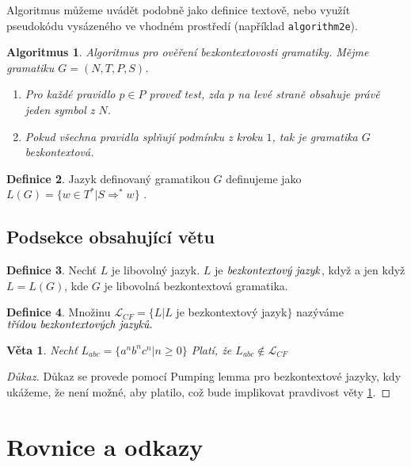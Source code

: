 \documentclass[11pt,a4paper, twocolumn]{article}
\theoremstyle{definition}
\newtheorem{defn}{Definice}[section]
\theoremstyle{plain}
\newtheorem{algr}[defn]{Algoritmus}
\newtheorem{veta}{Věta}
\begin{document}
Algoritmus můžeme uvádět podobně jako definice textově, nebo využít pseudokódu vysázeného ve vhodném prostředí (například \verb|algorithm2e|).


\begin{algr}Algoritmus pro ověření bezkontextovosti gramatiky. Mějme gramatiku $G = (N, T, P, S)$.
\begin{enumerate}
 \item Pro každé pravidlo $p\in P$ proveď test, zda $p$ na levé straně obsahuje právě jeden symbol z $N$.
 \item Pokud všechna pravidla splňují podmínku z kroku $1$, tak je gramatika $G$ bezkontextová.
\end{enumerate} 
\end{algr}

\begin{defn}Jazyk definovaný gramatikou $G$ definujeme jako $L(G) = \{ w\in T^*|S \Rightarrow ^* w\}$ .\end{defn}

\subsection{Podsekce obsahující větu}

\begin{defn}Nechť $L$ je libovolný jazyk. $L$ je $\text{\textit{bezkontextový jazyk}}$, když a jen když $L=L(G)$, kde $G$ je libovolná bezkontextová gramatika.\end{defn}

\begin{defn}Množinu $\mathcal{L}_{CF} = \{L|L$ je bezkontextový jazyk$\}$ nazýváme $\text{\textit{třídou bezkontextových jazyků.}}$\end{defn}

\begin{veta}\label{thm:first} Nechť $L_{abc} = \{ a^nb^nc^n|n \geq 0\}$ Platí, že $L_{abc} \not\in \mathcal{L}_{CF}$\end{veta}

\begin{proof}[Důkaz] Důkaz se provede pomocí Pumping lemma pro bezkontextové jazyky, kdy ukážeme, že není možné, aby platilo, což bude implikovat pravdivost věty \ref{thm:first}.
\end{proof}

\section{Rovnice a odkazy}
\end{document}
